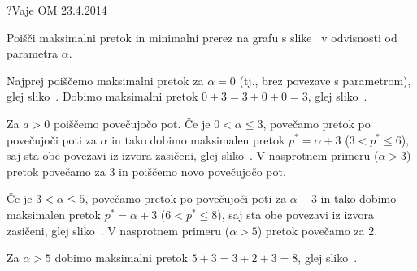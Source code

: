 \begin{naloga}{?}{Vaje OM 23.4.2014}
\begin{vprasanje}
Poišči maksimalni pretok in minimalni prerez na grafu s slike~\fig
v odvisnosti od parametra $\alpha$.

\begin{slika}
\pgfslika
{}
\end{slika}
\end{vprasanje}

\begin{odgovor}
Najprej poiščemo maksimalni pretok za $\alpha = 0$
(tj., brez povezave s parametrom), glej sliko~\fig[pretok3a].
Dobimo maksimalni pretok $0+3 = 3+0+0 = 3$, glej sliko~\fig[pretok3b].

Za $a > 0$ poiščemo povečujočo pot.
Če je $0 < \alpha \le 3$,
povečamo pretok po povečujoči poti za $\alpha$
in tako dobimo maksimalen pretok $p^* = \alpha+3$ ($3 < p^* \le 6$),
saj sta obe povezavi iz izvora zasičeni, glej sliko~\fig[pretok3c].
V nasprotnem primeru ($\alpha > 3$) pretok povečamo za $3$
in poiščemo novo povečujočo pot.

Če je $3 < \alpha \le 5$, povečamo pretok po povečujoči poti za $\alpha-3$
in tako dobimo maksimalen pretok $p^* = \alpha+3$ ($6 < p^* \le 8$),
saj sta obe povezavi iz izvora zasičeni, glej sliko~\fig[pretok3d].
V nasprotnem primeru ($\alpha > 5$) pretok povečamo za $2$.

Za $\alpha > 5$ dobimo maksimalni pretok $5+3 = 3+2+3 = 8$,
glej sliko~\fig[pretok3e].

\begin{slika}
\pgfslika[pretok3a]
\end{slika}
\begin{slika}
\pgfslika[pretok3b]
\end{slika}
\begin{slika}
\pgfslika[pretok3c]
\end{slika}
\begin{slika}
\pgfslika[pretok3d]
\end{slika}
\begin{slika}
\pgfslika[pretok3e]
\end{slika}
\end{odgovor}
\end{naloga}
